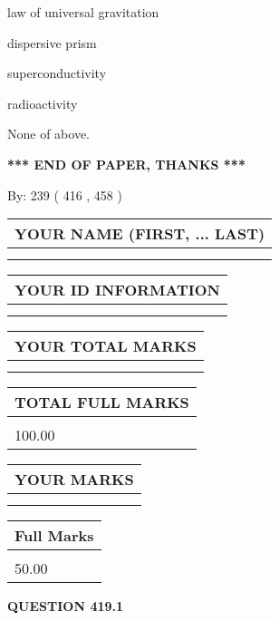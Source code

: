 \documentclass[12pt]{article}
\begin{document}
 
law of universal gravitation
 
 
dispersive prism
 
 
superconductivity
 
 
radioactivity
 
 
 None of above.
 
 
   
   
\vspace{1.0in} 
{\textbf{\large{ *** END OF PAPER, THANKS *** }}} 
   
   
\hspace{1.0in} By: 
 239 ( 416 ,  458 )
   
   
   
   
\newpage 
\setcounter{page}{ 
   419001 } 
   
   
   
   
\noindent\begin{tabular}{|l|}
\hline
YOUR NAME (FIRST, ... LAST)  \\
\hline
 \\ 
 \\ 
\hline
\end{tabular}
\hspace{0.05in} \begin{tabular}{|l|}
\hline
 YOUR   ID   INFORMATION  \\
\hline
 \\ 
 \\ 
\hline
\end{tabular}
   
   
\vspace{0.2in}\noindent\begin{tabular}{|l|}
\hline
YOUR TOTAL MARKS  \\
\hline
 \\ 
 \\ 
\hline
\end{tabular}
\hspace{0.05in} \begin{tabular}{|l|}
\hline
TOTAL FULL MARKS  \\
\hline
 \\ 
100.00 \\
\hline
\end{tabular}
  
\vspace{0.2in}
  
\noindent\begin{tabular}{|l|}
\hline
 YOUR MARKS  \\
\hline
 \\ 
 \\ 
\hline
\end{tabular}
\hspace{0.05in} \begin{tabular}{|l|}
\hline
 Full Marks  \\
\hline
 \\ 
50.00 \\
\hline
\end{tabular}
{\textbf{\Large{QUESTION
419.1 
}}}
  
\end{document}
